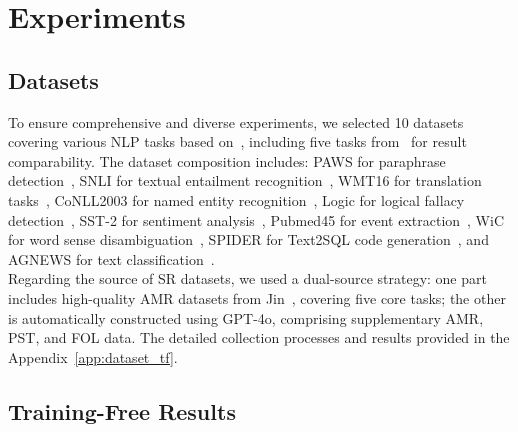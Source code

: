 \section{Experiments}
\label{experiment}

\subsection{Datasets}
To ensure comprehensive and diverse experiments, we selected 10 datasets covering various NLP tasks based on~\citet{liu2024datasets}, including five tasks from~\citet{jin2024analyzing} for result comparability. The dataset composition includes: PAWS for paraphrase detection~\citep{zhang2019paws}, SNLI for textual entailment recognition~\citep{bowman2015large}, WMT16 for translation tasks~\citep{bojar2016findings}, CoNLL2003 for named entity recognition~\citep{sang2003introduction}, Logic for logical fallacy detection~\citep{jin2022logical}, SST-2 for sentiment analysis~\citep{socher2013recursive}, Pubmed45 for event extraction~\citep{garg2016extracting}, WiC for word sense disambiguation~\citep{pilehvar2018wic}, SPIDER for Text2SQL code generation~\citep{yu2018spider}, and AGNEWS for text classification~\citep{zhang2015character}. \\
Regarding the source of SR datasets, we used a dual-source strategy: one part includes high-quality AMR datasets from Jin~\cite{jin2024analyzing}, covering five core tasks; the other is automatically constructed using GPT-4o, comprising supplementary AMR, PST, and FOL data. The detailed collection processes and results provided in the Appendix~\ref{app:dataset_tf}.

\subsection{Training-Free Results}

